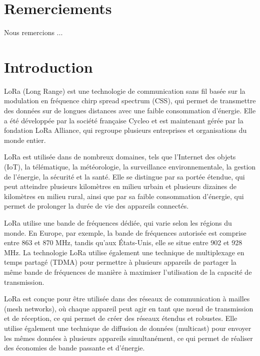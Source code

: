 \documentclass[12pt,a4paper,oneside, titlepage]{report}
\begin{document}
{}
\chapter*{Remerciements}
\renewcommand{\leftmark}{REMERCIEMENTS}

Nous remercions ...\\

\newpage
\renewcommand{\leftmark}{TABLE DES MATI\`{E}RES}
\thispagestyle{fancy}
\tableofcontents


\newpage
{}
\renewcommand{\leftmark}{INTRODUCTION}
\chapter*{Introduction}

LoRa (Long Range) est une technologie de communication sans fil basée sur la modulation en fréquence chirp spread spectrum (CSS), qui permet de transmettre des données sur de longues distances avec une faible consommation d'énergie. Elle a été développée par la société française Cycleo et est maintenant gérée par la fondation LoRa Alliance, qui regroupe plusieurs entreprises et organisations du monde entier.

LoRa est utilisée dans de nombreux domaines, tels que l'Internet des objets (IoT), la télématique, la météorologie, la surveillance environnementale, la gestion de l'énergie, la sécurité et la santé. Elle se distingue par sa portée étendue, qui peut atteindre plusieurs kilomètres en milieu urbain et plusieurs dizaines de kilomètres en milieu rural, ainsi que par sa faible consommation d'énergie, qui permet de prolonger la durée de vie des appareils connectés.

LoRa utilise une bande de fréquences dédiée, qui varie selon les régions du monde. En Europe, par exemple, la bande de fréquences autorisée est comprise entre 863 et 870 MHz, tandis qu'aux États-Unis, elle se situe entre 902 et 928 MHz. La technologie LoRa utilise également une technique de multiplexage en temps partagé (TDMA) pour permettre à plusieurs appareils de partager la même bande de fréquences de manière à maximiser l'utilisation de la capacité de transmission.

LoRa est conçue pour être utilisée dans des réseaux de communication à mailles (mesh networks), où chaque appareil peut agir en tant que nœud de transmission et de réception, ce qui permet de créer des réseaux étendus et robustes. Elle utilise également une technique de diffusion de données (multicast) pour envoyer les mêmes données à plusieurs appareils simultanément, ce qui permet de réaliser des économies de bande passante et d'énergie.
\end{document}
